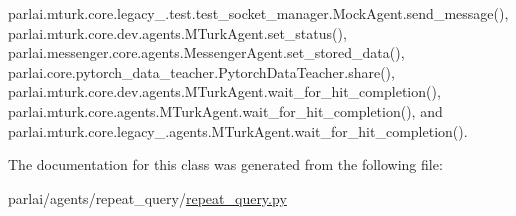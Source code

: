 parlai.\+mturk.\+core.\+legacy\+\_.\+test.\+test\+\_\+socket\+\_\+manager.\+Mock\+Agent.\+send\+\_\+message(), parlai.\+mturk.\+core.\+dev.\+agents.\+M\+Turk\+Agent.\+set\+\_\+status(), parlai.\+messenger.\+core.\+agents.\+Messenger\+Agent.\+set\+\_\+stored\+\_\+data(), parlai.\+core.\+pytorch\+\_\+data\+\_\+teacher.\+Pytorch\+Data\+Teacher.\+share(), parlai.\+mturk.\+core.\+dev.\+agents.\+M\+Turk\+Agent.\+wait\+\_\+for\+\_\+hit\+\_\+completion(), parlai.\+mturk.\+core.\+agents.\+M\+Turk\+Agent.\+wait\+\_\+for\+\_\+hit\+\_\+completion(), and parlai.\+mturk.\+core.\+legacy\+\_.\+agents.\+M\+Turk\+Agent.\+wait\+\_\+for\+\_\+hit\+\_\+completion().



The documentation for this class was generated from the following file\+:\begin{DoxyCompactItemize}
\item 
parlai/agents/repeat\+\_\+query/\hyperlink{repeat__query_8py}{repeat\+\_\+query.\+py}\end{DoxyCompactItemize}
